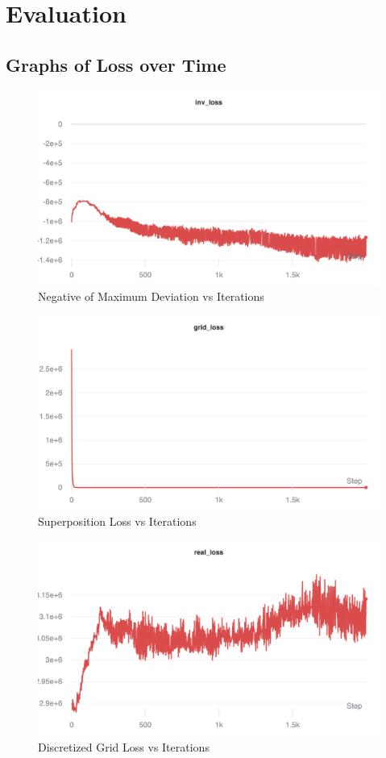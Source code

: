 \section{Evaluation}%
\label{sec:evaluation}
\subsection{Graphs of Loss over Time}%
\label{sub:graphs_of_loss_over_time}
\begin{figure}[htpb]
    \centering
    \includegraphics[width=0.8\linewidth]{images/invloss.png}
    \caption{Negative of Maximum Deviation vs Iterations}%
\end{figure}
\begin{figure}[htpb]
    \centering
    \includegraphics[width=0.8\linewidth]{images/gridloss.png}
    \caption{Superposition Loss vs Iterations}%
\end{figure}
\begin{figure}[htpb]
    \centering
    \includegraphics[width=0.8\linewidth]{images/real_loss.png}
    \caption{Discretized Grid Loss vs Iterations}%
\end{figure}

